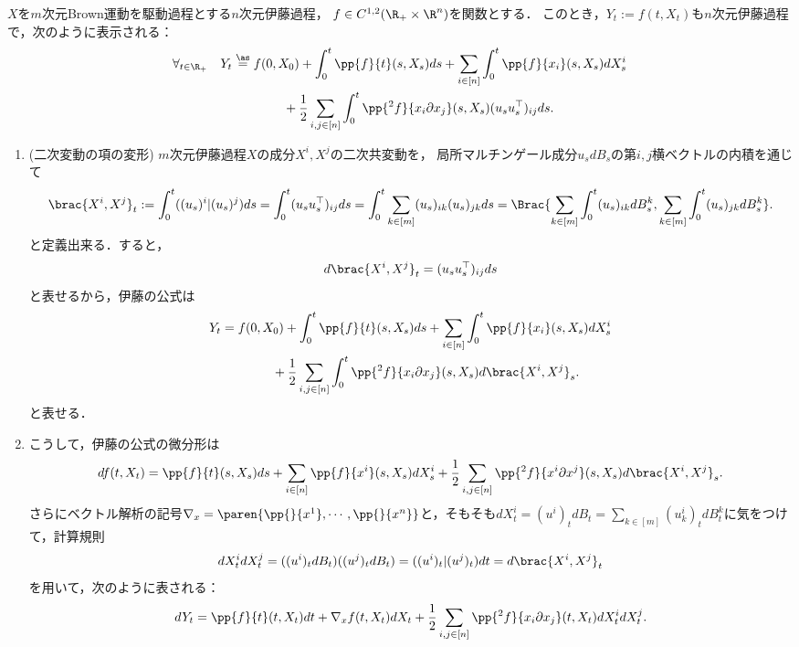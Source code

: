 \documentclass[uplatex,dvipdfmx]{jsreport}
\begin{document}
\begin{theorem}
    $X$を$m$次元Brown運動を駆動過程とする$n$次元伊藤過程，
    $f\in C^{1,2}(\R_+\times\R^n)$を関数とする．
    このとき，$Y_t:=f(t,X_t)$も$n$次元伊藤過程で，次のように表示される：
    \begin{align*}
        \forall_{t\in\R_+}\quad Y_t&\overset{\as}{=}f(0,X_0)+\int^t_0\pp{f}{t}(s,X_s)ds+\sum_{i\in[n]}\int^t_0\pp{f}{x_i}(s,X_s)dX_s^i\\
        &\qquad\qquad+\frac{1}{2}\sum_{i,j\in[n]}\int^t_0\pp{^2f}{x_i\partial x_j}(s,X_s)(u_su_s^\top)_{ij}ds.
    \end{align*}
\end{theorem}
\begin{remarks}\mbox{}
    \begin{enumerate}
        \item (二次変動の項の変形) $m$次元伊藤過程$X$の成分$X^i,X^j$の二次共変動を，
        局所マルチンゲール成分$u_sdB_s$の第$i,j$横ベクトルの内積を通じて
        \[\brac{X^i,X^j}_t:=\int^t_0((u_s)^i|(u_s)^j)ds=\int^t_0(u_su_s^\top)_{ij}ds=\int^t_0\sum_{k\in[m]}(u_s)_{ik}(u_s)_{jk}ds=\Brac{\sum_{k\in[m]}\int^t_0(u_s)_{ik}dB_s^k,\sum_{k\in[m]}\int^t_0(u_s)_{jk}dB_s^k}.\]
        と定義出来る．すると，
        \[d\brac{X^i,X^j}_t=(u_su_s^\top)_{ij}ds\]
        と表せるから，伊藤の公式は
        \begin{align*}
            Y_t&=f(0,X_0)+\int^t_0\pp{f}{t}(s,X_s)ds+\sum_{i\in[n]}\int^t_0\pp{f}{x_i}(s,X_s)dX^i_s\\
            &\qquad\qquad+\frac{1}{2}\sum_{i,j\in[n]}\int^t_0\pp{^2f}{x_i\partial x_j}(s,X_s)d\brac{X^i,X^j}_s.
        \end{align*}
        と表せる．
        \item こうして，伊藤の公式の微分形は
        \[df(t,X_t)=\pp{f}{t}(s,X_s)ds+\sum_{i\in[n]}\pp{f}{x^i}(s,X_s)dX_s^i+\frac{1}{2}\sum_{i,j\in[n]}\pp{^2f}{x^i\partial x^j}(s,X_s)d\brac{X^i,X^j}_s.\]
        さらにベクトル解析の記号$\nabla_x=\paren{\pp{}{x^1},\cdots,\pp{}{x^n}}$と，そもそも$dX^i_t=(u^i)_tdB_t=\sum_{k\in[m]}(u^i_k)_tdB^k_t$に気をつけて，計算規則
        \[dX^i_tdX^j_t=((u^i)_tdB_t)((u^j)_tdB_t)=((u^i)_t|(u^j)_t)dt=d\brac{X^i,X^j}_t\]
        を用いて，次のように表される：
        \[dY_t=\pp{f}{t}(t,X_t)dt+\nabla_xf(t,X_t)dX_t+\frac{1}{2}\sum_{i,j\in[n]}\pp{^2f}{x_i\partial x_j}(t,X_t)dX_t^idX_t^j.\]
    \end{enumerate}
\end{remarks}
\end{document}
